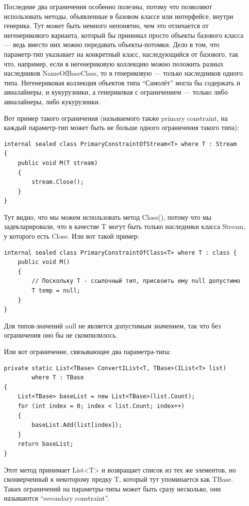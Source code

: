 \documentclass[a5paper]{article}
\begin{document}
Последние два ограничения особенно полезны, потому что позволяют использовать методы, объявленные в базовом классе или интерфейсе, внутри генерика. Тут может быть немного непонятно, чем это отличается от негенерикового варианта, который бы принимал просто объекты базового класса --- ведь вместо них можно передавать объекты-потомки. Дело в том, что параметр-тип указывает на конкретный класс, наследующийся от базового, так что, например, если в негенериковую коллекцию можно положить разных наследников NameOfBaseClass, то в генериковую --- только наследников одного типа. Негенериковая коллекция объектов типа ``Самолёт'' могла бы содержать и авиалайнеры, и кукурузники, а генериковая с ограничением --- только либо авиалайнеры, либо кукурузники.

Вот пример такого ограничения (называемого также primary constraint, на каждый параметр-тип может быть не больше одного ограничения такого типа):

\begin{verbatim}
internal sealed class PrimaryConstraintOfStream<T> where T : Stream 
{
    public void M(T stream) 
    {
        stream.Close();
    }
}
\end{verbatim}

Тут видно, что мы можем использовать метод Close(), потому что мы задекларировали, что в качестве T могут быть только наследники класса Stream, у которого есть Close. Или вот такой пример:

\begin{verbatim}
internal sealed class PrimaryConstraintOfClass<T> where T : class {
    public void M() 
    {
        // Поскольку T - ссылочный тип, присвоить ему null допустимо
        T temp = null;
    }
}
\end{verbatim}

Для типов-значений null не является допустимым значением, так что без ограничения оно бы не скомпилилось.

Или вот ограничение, связывающее два параметра-типа:

\begin{verbatim}
private static List<TBase> ConvertIList<T, TBase>(IList<T> list)
        where T : TBase 
{
    List<TBase> baseList = new List<TBase>(list.Count);
    for (int index = 0; index < list.Count; index++) 
    {
        baseList.Add(list[index]);
    }
    return baseList;
}
\end{verbatim}

Этот метод принимает List<T> и возвращает список из тех же элементов, но сконверченный к некоторому предку T, который тут упоминается как TBase. Таких ограничений на параметры-типы может быть сразу несколько, они называются ``secondary constraint''.
\end{document}
